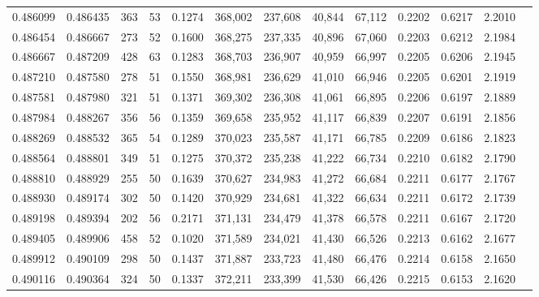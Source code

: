 \begin{tabular}{rrrrrrrrrrrrr}
0.486099 & 0.486435 &    363 &    53 &                                     0.1274 & 368,002 & 237,608 &  40,844 &  67,112 & 0.2202 & 0.6217 & 2.2010 \\
0.486454 & 0.486667 &    273 &    52 &                                     0.1600 & 368,275 & 237,335 &  40,896 &  67,060 & 0.2203 & 0.6212 & 2.1984 \\
0.486667 & 0.487209 &    428 &    63 &                                     0.1283 & 368,703 & 236,907 &  40,959 &  66,997 & 0.2205 & 0.6206 & 2.1945 \\
0.487210 & 0.487580 &    278 &    51 &                                     0.1550 & 368,981 & 236,629 &  41,010 &  66,946 & 0.2205 & 0.6201 & 2.1919 \\
0.487581 & 0.487980 &    321 &    51 &                                     0.1371 & 369,302 & 236,308 &  41,061 &  66,895 & 0.2206 & 0.6197 & 2.1889 \\
0.487984 & 0.488267 &    356 &    56 &                                     0.1359 & 369,658 & 235,952 &  41,117 &  66,839 & 0.2207 & 0.6191 & 2.1856 \\
0.488269 & 0.488532 &    365 &    54 &                                     0.1289 & 370,023 & 235,587 &  41,171 &  66,785 & 0.2209 & 0.6186 & 2.1823 \\
0.488564 & 0.488801 &    349 &    51 &                                     0.1275 & 370,372 & 235,238 &  41,222 &  66,734 & 0.2210 & 0.6182 & 2.1790 \\
0.488810 & 0.488929 &    255 &    50 &                                     0.1639 & 370,627 & 234,983 &  41,272 &  66,684 & 0.2211 & 0.6177 & 2.1767 \\
0.488930 & 0.489174 &    302 &    50 &                                     0.1420 & 370,929 & 234,681 &  41,322 &  66,634 & 0.2211 & 0.6172 & 2.1739 \\
0.489198 & 0.489394 &    202 &    56 &                                     0.2171 & 371,131 & 234,479 &  41,378 &  66,578 & 0.2211 & 0.6167 & 2.1720 \\
0.489405 & 0.489906 &    458 &    52 &                                     0.1020 & 371,589 & 234,021 &  41,430 &  66,526 & 0.2213 & 0.6162 & 2.1677 \\
0.489912 & 0.490109 &    298 &    50 &                                     0.1437 & 371,887 & 233,723 &  41,480 &  66,476 & 0.2214 & 0.6158 & 2.1650 \\
0.490116 & 0.490364 &    324 &    50 &                                     0.1337 & 372,211 & 233,399 &  41,530 &  66,426 & 0.2215 & 0.6153 & 2.1620 \\

\end{tabular}
